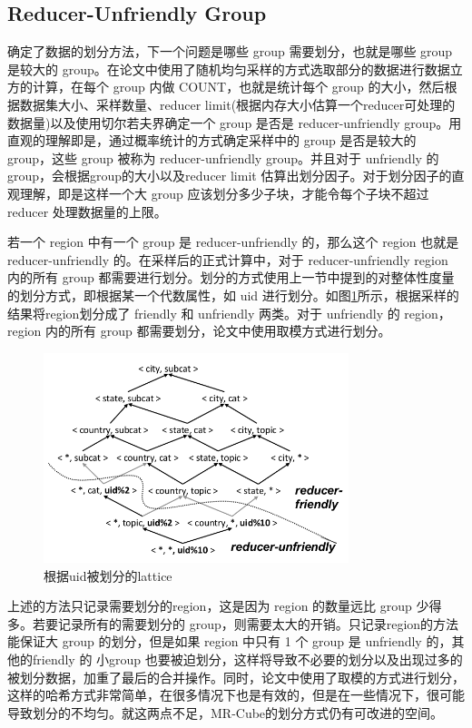 \subsection{Reducer-Unfriendly Group}

确定了数据的划分方法，下一个问题是哪些 group 需要划分，也就是哪些 group 是较大的 group。在论文中使用了随机均匀采样的方式选取部分的数据进行数据立方的计算，在每个 group 内做 COUNT，也就是统计每个 group 的大小，然后根据数据集大小、采样数量、reducer limit(根据内存大小估算一个reducer可处理的数据量)以及使用切尔若夫界确定一个 group 是否是 reducer-unfriendly group。用直观的理解即是，通过概率统计的方式确定采样中的 group 是否是较大的 group，这些 group 被称为 reducer-unfriendly group。并且对于 unfriendly 的 group，会根据group的大小以及reducer limit 估算出划分因子。对于划分因子的直观理解，即是这样一个大 group 应该划分多少子块，才能令每个子块不超过 reducer 处理数据量的上限。

若一个 region 中有一个 group 是 reducer-unfriendly 的，那么这个 region 也就是 reducer-unfriendly 的。在采样后的正式计算中，对于 reducer-unfriendly region 内的所有 group 都需要进行划分。划分的方式使用上一节中提到的对整体性度量的划分方式，即根据某一个代数属性，如 uid 进行划分。如图\ref{region_partition}所示，根据采样的结果将region划分成了 friendly 和 unfriendly 两类。对于 unfriendly 的 region，region 内的所有 group 都需要划分，论文中使用取模方式进行划分。

\begin{figure}[!htb]
\centering\includegraphics[width=3.5in]{picture/ch_datacube_mr/region_partition} 
\caption{根据uid被划分的lattice}\label{region_partition} 
\end{figure} 

上述的方法只记录需要划分的region，这是因为 region 的数量远比 group 少得多。若要记录所有的需要划分的 group，则需要太大的开销。只记录region的方法能保证大 group 的划分，但是如果 region 中只有 1 个 group 是 unfriendly 的，其他的friendly 的 小group 也要被迫划分，这样将导致不必要的划分以及出现过多的被划分数据，加重了最后的合并操作。同时，论文中使用了取模的方式进行划分，这样的哈希方式非常简单，在很多情况下也是有效的，但是在一些情况下，很可能导致划分的不均匀。就这两点不足，MR-Cube的划分方式仍有可改进的空间。

